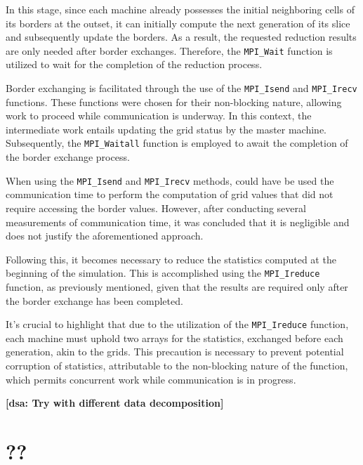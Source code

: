 \documentclass{article}
\newcommand{\dsanote}[1]{\textbf{[dsa: #1]}}
\begin{document}
In this stage, since each machine already possesses the initial neighboring cells of its borders at the outset, it 
can initially compute the next generation of its slice and subsequently update the borders. As a result, the requested 
reduction results are only needed after border exchanges. Therefore, the \texttt{MPI\_Wait} function is utilized to wait 
for the completion of the reduction process.


Border exchanging is facilitated through the use of the \texttt{MPI\_Isend} and \texttt{MPI\_Irecv} functions.
These functions were chosen for their non-blocking nature, allowing work to proceed while communication is underway. 
In this context, the intermediate work entails updating the grid status by the master machine. Subsequently, the 
\texttt{MPI\_Waitall} function is employed to await the completion of the border exchange process.

When using the \texttt{MPI\_Isend} and \texttt{MPI\_Irecv} methods, could have be used the communication time to 
perform the computation of grid values that did not require accessing the border values. However, after conducting 
several measurements of communication time, it was concluded that it is negligible and does not 
justify the aforementioned approach.

Following this, it becomes necessary to reduce the statistics computed at the beginning of the simulation. 
This is accomplished using the \texttt{MPI\_Ireduce} function, as previously mentioned, given that the results 
are required only after the border exchange has been completed.

It's crucial to highlight that due to the utilization of the \texttt{MPI\_Ireduce} function, each machine must uphold 
two arrays for the statistics, exchanged before each generation, akin to the grids. This precaution is necessary to 
prevent potential corruption of statistics, attributable to the non-blocking nature of the function, which permits concurrent 
work while communication is in progress.



\dsanote{Try with different data decomposition}

\section{??}
\end{document}
